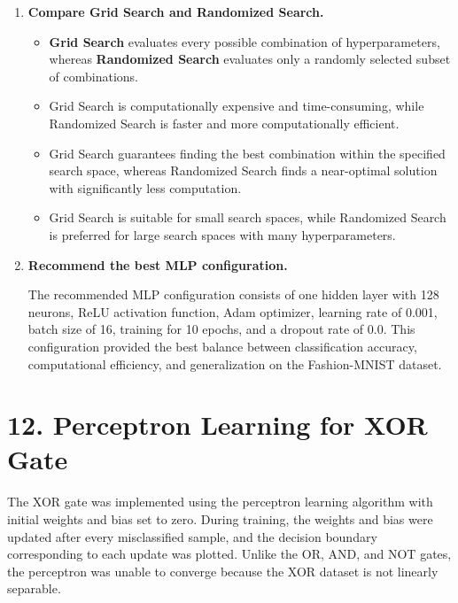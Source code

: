 \documentclass[11pt]{article}
\begin{document}
\begin{enumerate}
\vspace{0.3cm}


\item \textbf{Compare Grid Search and Randomized Search.}

\begin{itemize}
    \item \textbf{Grid Search} evaluates every possible combination of hyperparameters, whereas \textbf{Randomized Search} evaluates only a randomly selected subset of combinations.
    
    \item Grid Search is computationally expensive and time-consuming, while Randomized Search is faster and more computationally efficient.
    
    \item Grid Search guarantees finding the best combination within the specified search space, whereas Randomized Search finds a near-optimal solution with significantly less computation.
    
    \item Grid Search is suitable for small search spaces, while Randomized Search is preferred for large search spaces with many hyperparameters.
\end{itemize}

\vspace{0.3cm}

\item \textbf{Recommend the best MLP configuration.}

The recommended MLP configuration consists of one hidden layer with 128 neurons, ReLU activation function, Adam optimizer, learning rate of 0.001, batch size of 16, training for 10 epochs, and a dropout rate of 0.0. This configuration provided the best balance between classification accuracy, computational efficiency, and generalization on the Fashion-MNIST dataset.

\end{enumerate}

\section*{12. Perceptron Learning for XOR Gate}

The XOR gate was implemented using the perceptron learning algorithm with initial weights and bias set to zero. During training, the weights and bias were updated after every misclassified sample, and the decision boundary corresponding to each update was plotted. Unlike the OR, AND, and NOT gates, the perceptron was unable to converge because the XOR dataset is not linearly separable.
\end{document}
